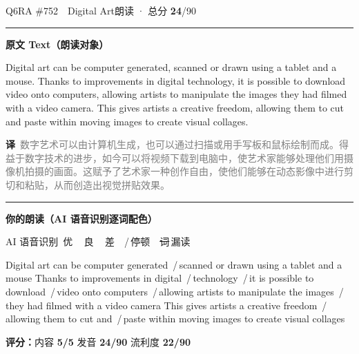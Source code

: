 \documentclass[11pt]{article}
\newcommand{\sfull}[1]{\textcolor{cFix}{\bfseries #1}}     %
\newcommand{\spart}[1]{\textcolor{cPartial}{\bfseries #1}} %
\newcommand{\ptesub}[1]{%
  \par\needspace{2\baselineskip}\smallskip
  {\color{cAccent}\rule[-0.2ex]{3pt}{1.05em}}\hspace{6pt}%
  {\bfseries\color{cHead}#1}\par\nopagebreak\smallskip}
\newcommand{\sg}[1]{\textcolor{cSpkGood}{#1}}   %
\newcommand{\sy}[1]{\textcolor{cSpkOk}{#1}}     %
\newcommand{\sr}[1]{\textcolor{cSpkBad}{#1}}    %
\newcommand{\pse}{{\color{gray}\,/\,}}          %
\newcommand{\asrlegend}{{\footnotesize\color{gray}AI 语音识别\quad
  {\color{cSpkGood}\textbullet}\,优\ \ {\color{cSpkOk}\textbullet}\,良\ \
  {\color{cSpkBad}\textbullet}\,差\ \ {\color{gray}/}\,停顿\ \
  {\color{cSpkBad}\sout{词}}\,漏读}}
\newcommand{\zh}[1]{{\footnotesize\textcolor{cNote}{\textbf{译}}\ \textcolor{gray}{#1}}}
\begin{document}
\begin{qblock}{Q6\quad RA \#752\ \ Digital Art}{朗读 · 总分 \textcolor{cAccent}{\bfseries 24}/90}
\ptesub{原文 Text（朗读对象）}
\begin{promptbox}
Digital art can be computer generated, scanned or drawn using a tablet and a mouse. Thanks to improvements in digital technology, it is possible to download video onto computers, allowing artists to manipulate the images they had filmed with a video camera. This gives artists a creative freedom, allowing them to cut and paste within moving images to create visual collages.
\end{promptbox}
\zh{数字艺术可以由计算机生成，也可以通过扫描或用手写板和鼠标绘制而成。得益于数字技术的进步，如今可以将视频下载到电脑中，使艺术家能够处理他们用摄像机拍摄的画面。这赋予了艺术家一种创作自由，使他们能够在动态影像中进行剪切和粘贴，从而创造出视觉拼贴效果。}
\ptesub{你的朗读（AI 语音识别逐词配色）}
\asrlegend
\begin{asrbox}
\sr{Digital} \sg{art} \sg{can} \sg{be} \sg{computer} \sg{generated} \pse \sg{scanned} \sg{or} \sr{drawn} \sg{using} \sg{a} \sr{tablet} \sg{and} \sg{a} \sg{mouse} \sg{Thanks} \sg{to} \sg{improvements} \sg{in} \sr{digital} \pse \sr{technology} \pse \sg{it} \sg{is} \sr{possible} \sg{to} \sr{download} \pse \sg{video} \sg{onto} \sg{computers} \pse \sg{allowing} \sr{artists} \sg{to} \sr{manipulate} \sg{the} \sr{images} \pse \sg{they} \sr{had} \sr{filmed} \sg{with} \sg{a} \sg{video} \sg{camera} \sr{This} \sg{gives} \sr{artists} \sg{a} \sg{creative} \sr{freedom} \pse \sg{allowing} \sy{them} \sg{to} \sy{cut} \sg{and} \pse \sr{paste} \sg{within} \sg{moving} \sr{images} \sg{to} \sg{create} \sg{visual} \sr{collages}
\end{asrbox}
\smallskip
{\small\textbf{评分：}内容 \sfull{5/5} \quad\textperiodcentered\quad 发音 \spart{24/90} \quad\textperiodcentered\quad 流利度 \spart{22/90}}\quad{\footnotesize\color{gray}（用时 01:12）}
\end{qblock}
\end{document}
